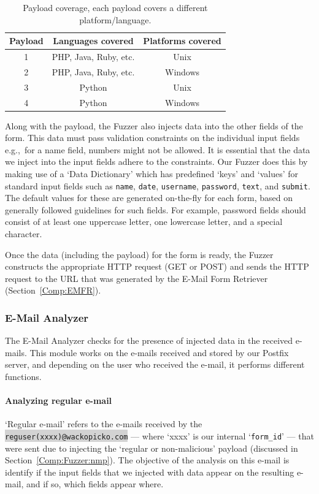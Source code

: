 \begin{table}[!htbp]
	\centering
	\begin{tabular}{|c|c|c|}
		\hline
		\multicolumn{1}{|c|}{\textbf{Payload}} & \multicolumn{1}{c}{\textbf{Languages covered}} & \multicolumn{1}{|c|}{\textbf{Platforms covered}}\\
		\hline
		1 & PHP, Java, Ruby, etc. & Unix\\
		\hline
		2 & PHP, Java, Ruby, etc. & Windows\\
		\hline
		3 & Python & Unix\\
		\hline
		4 & Python & Windows\\
		\hline
	\end{tabular}
	\caption[]{Payload coverage, each payload covers a different platform/language.}
	\label{tab:payloadcov}
\end{table}
Along with the payload, the Fuzzer also injects data into the other fields of the form. This data must pass validation constraints on the individual input fields e.g.,\ for a name field, numbers might not be allowed. It is essential that the data we inject into the input fields adhere to the constraints. Our Fuzzer does this by making use of a `Data Dictionary' which has predefined `keys' and `values' for standard input fields such as \texttt{name}, \texttt{date}, \texttt{username}, \texttt{password}, \texttt{text}, and \texttt{submit}. The default values for these are generated on-the-fly for each form, based on generally followed guidelines for such fields. For example, password fields should consist of at least one uppercase letter, one lowercase letter, and a special character.

Once the data (including the payload) for the form is ready, the Fuzzer constructs the appropriate HTTP request (GET or POST) and sends the HTTP request to the URL that was generated by the E-Mail Form Retriever (Section~\ref{Comp:EMFR}). 


\subsubsection{E-Mail Analyzer}
\label{Comp:EMA}
The E-Mail Analyzer checks for the presence of injected data in the received e-mails. This module works on the e-mails received and stored by our Postfix server, and depending on the user who received the e-mail, it performs different functions.
\paragraph{Analyzing regular e-mail}
`Regular e-mail' refers to the e-mails received by the \colorbox{lightgray}{\lstinline{reguser(xxxx)@wackopicko.com}} --- where `xxxx' is our internal `\lstinline{form_id}' --- that were sent due to injecting the `regular or non-malicious' payload (discussed in Section~\ref{Comp:Fuzzer:nmp}). The objective of the analysis on this e-mail is identify if the input fields that we injected with data appear on the resulting e-mail, and if so, which fields appear where.

